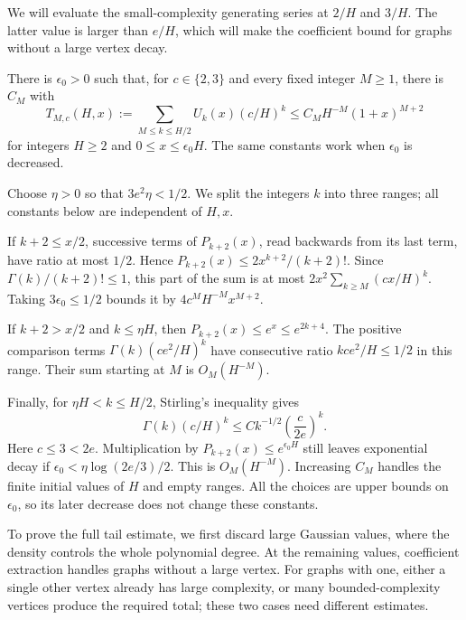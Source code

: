 We will evaluate the small-complexity generating series at $2/H$
and $3/H$. The latter value is larger than $e/H$, which will make
the coefficient bound for graphs without a large vertex decay.

\begin{lmm}
\label{lmm:s03:short-series}
There is $\epsilon_0>0$ such that, for $c\in\{2,3\}$ and every
fixed integer $M\geq1$, there is $C_M$ with
\begin{equation}
\label{eq:s03:short-series}
T_{M,c}(H,x):=\sum_{M\leq k\leq H/2}U_k(x)(c/H)^k
\leq C_MH^{-M}(1+x)^{M+2}
\end{equation}
for integers $H\geq2$ and $0\leq x\leq\epsilon_0H$.
The same constants work when $\epsilon_0$ is decreased.
\end{lmm}
\begin{prf}
Choose $\eta>0$ so that $3e^2\eta<1/2$. We split the integers $k$
into three ranges; all constants below are independent of $H,x$.

If $k+2\leq x/2$, successive terms of $P_{k+2}(x)$, read backwards
from its last term, have ratio at most $1/2$. Hence
$P_{k+2}(x)\leq2x^{k+2}/(k+2)!$. Since
$\Gamma(k)/(k+2)!\leq1$, this part of the sum is at most
$2x^2\sum_{k\geq M}(cx/H)^k$. Taking $3\epsilon_0\leq1/2$
bounds it by $4c^MH^{-M}x^{M+2}$.

If $k+2>x/2$ and $k\leq\eta H$, then
$P_{k+2}(x)\leq e^x\leq e^{2k+4}$. The positive comparison terms
$\Gamma(k)(ce^2/H)^k$ have consecutive ratio
$kce^2/H\leq1/2$ in this range. Their sum starting at $M$ is
$O_M(H^{-M})$.

Finally, for $\eta H<k\leq H/2$, Stirling's inequality gives
\[
\Gamma(k)(c/H)^k
\leq Ck^{-1/2}\left(\frac{c}{2e}\right)^k.
\]
Here $c\leq3<2e$. Multiplication by
$P_{k+2}(x)\leq e^{\epsilon_0H}$ still leaves exponential decay
if $\epsilon_0<\eta\log(2e/3)/2$. This is $O_M(H^{-M})$.
Increasing $C_M$ handles the finite initial values of $H$ and empty
ranges. All the choices are upper bounds on $\epsilon_0$, so its
later decrease does not change these constants.
\end{prf}

To prove the full tail estimate, we first discard large Gaussian
values, where the density controls the whole polynomial degree.
At the remaining values, coefficient extraction handles graphs
without a large vertex. For graphs with one, either a single other
vertex already has large complexity, or many bounded-complexity vertices
produce the required total; these two cases need different estimates.

